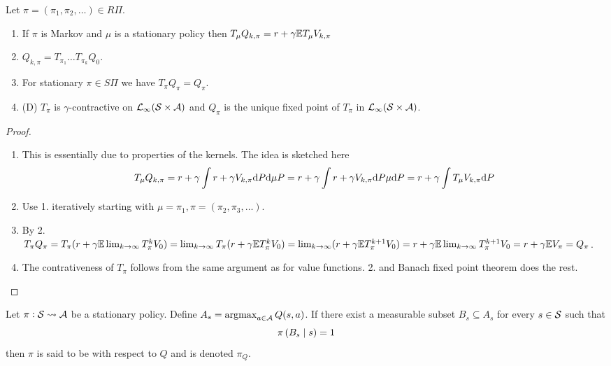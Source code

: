 \begin{prop}
  Let $\pi = (\pi_1, \pi_2, \dots) \in R\Pi$.
  \leavevmode
  \begin{enumerate}
    \item If $\pi$ is Markov and $\mu$ is a stationary policy then
      $T_\mu Q_{k, \pi}
      = r + \gamma \mathbb{E} T_\mu V_{k, \pi}$
    \item $Q_{k, \pi} = T_{\pi_1} \dots T_{\pi_k} Q_0$. 
    \item For stationary $\pi \in S\Pi$ we have
      $T_\pi Q_\pi = Q_\pi$.
    \item (D) $T_\pi$ is $\gamma$-contractive on
      $\mathcal{L}_\infty(\mathcal{S}\times\mathcal{A})$
      and $Q_\pi$ is the unique fixed point of $T_\pi$ in
      $\mathcal{L}_\infty(\mathcal{S}\times\mathcal{A})$.
  \end{enumerate}
  \label{prop:TQ}
\end{prop}
\begin{proof}
  \leavevmode
  \begin{enumerate}
    \item This is essentially due to properties of the kernels. The idea is
      sketched here
      \begin{align*}
	T_\mu Q_{k, \pi} = r + \gamma \int r + \gamma V_{k, \pi}
	\mathrm{d} P \mathrm{d} \mu P
	= r + \gamma \int r + \gamma V_{k, \pi} \mathrm{d} P \mu \mathrm{d} P
	= r + \gamma \int T_\mu V_{k, \pi} \mathrm{d} P
      \end{align*}
    \item Use 1. iteratively starting with
      $\mu = \pi_1, \pi = (\pi_2, \pi_3, \dots)$.
    \item By 2. $T_\pi Q_\pi = T_\pi (r + \gamma \mathbb{E} \lim_{k\to\infty} T_\pi^k V_0)
      = \lim_{k\to\infty} T_\pi (r + \gamma \mathbb{E} T_\pi^k V_0)
      = \lim_{k\to\infty} (r + \gamma \mathbb{E} T_\pi^{k+1} V_0)
      = r + \gamma \mathbb{E} \lim_{k\to\infty} T^{k+1}_\pi V_0
      = r + \gamma \mathbb{E} V_\pi = Q_\pi$.
    \item The contrativeness of $T_\pi$ follows from the same argument as for
      value functions. 2. and Banach fixed point theorem does the rest.
  \end{enumerate}
\end{proof}

\begin{defn}
  Let $\pi : \mathcal{S} \leadsto \mathcal{A}$ be a stationary policy. Define
  $A_s = \operatorname*{argmax}_{a \in \mathcal{A}} Q(s, a)$.
  If there exist a measurable subset $B_s \subseteq A_s$
  for every $s \in \mathcal{S}$ such that
  \[ \pi \left( B_s \;\middle\vert\; s \right) = 1 \]
  then $\pi$ is said to be  with respect to $Q$ and is
  denoted $\pi_Q$.
\end{defn}

